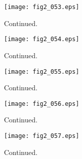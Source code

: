 \documentclass[preprint]{aastex}
\begin{document}
\setcounter{figure}{1}
\begin{figure}[t]
\centering
\texttt{[image: fig2\_053.eps]}
\caption{
Continued. 
}
\label{Fig2}
\end{figure}
\clearpage



\setcounter{figure}{1}
\begin{figure}[t]
\centering
\texttt{[image: fig2\_054.eps]}
\caption{
Continued. 
}
\label{Fig2}
\end{figure}
\clearpage



\setcounter{figure}{1}
\begin{figure}[t]
\centering
\texttt{[image: fig2\_055.eps]}
\caption{
Continued. 
}
\label{Fig2}
\end{figure}
\clearpage



\setcounter{figure}{1}
\begin{figure}[t]
\centering
\texttt{[image: fig2\_056.eps]}
\caption{
Continued. 
}
\label{Fig2}
\end{figure}
\clearpage



\setcounter{figure}{1}
\begin{figure}[t]
\centering
\texttt{[image: fig2\_057.eps]}
\caption{
Continued. 
}
\label{Fig2}
\end{figure}
\clearpage
\end{document}
